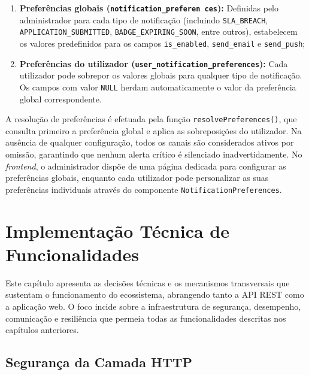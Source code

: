 \documentclass[12pt,a4paper]{report}
\begin{document}
\begin{enumerate}
  \item \textbf{Preferências globais (\texttt{notification\_preferen ces}):} Definidas pelo administrador para cada tipo de notificação (incluindo \texttt{SLA\_\allowbreak BREACH}, \texttt{APPLICATION\_\allowbreak SUBMITTED}, \texttt{BADGE\_\allowbreak EXPIRING\_\allowbreak SOON}, entre outros), estabelecem os valores predefinidos para os campos \texttt{is\_enabled}, \texttt{send\_email} e \texttt{send\_push};
  \item \textbf{Preferências do utilizador (\texttt{user\_\allowbreak notification\_\allowbreak preferences}):} Cada utilizador pode sobrepor os valores globais para qualquer tipo de notificação. Os campos com valor \texttt{NULL} herdam automaticamente o valor da preferência global correspondente.
\end{enumerate}

A resolução de preferências é efetuada pela função \texttt{resolvePreferences()}, que consulta primeiro a preferência global e aplica as sobreposições do utilizador. Na ausência de qualquer configuração, todos os canais são considerados ativos por omissão, garantindo que nenhum alerta crítico é silenciado inadvertidamente. No \textit{frontend}, o administrador dispõe de uma página dedicada para configurar as preferências globais, enquanto cada utilizador pode personalizar as suas preferências individuais através do componente \texttt{NotificationPreferences}.

\chapter{Implementação Técnica de Funcionalidades}
\label{ch:implementacao-tecnica}

Este capítulo apresenta as decisões técnicas e os mecanismos transversais que sustentam o funcionamento do ecossistema, abrangendo tanto a API REST como a aplicação web. O foco incide sobre a infraestrutura de segurança, desempenho, comunicação e resiliência que permeia todas as funcionalidades descritas nos capítulos anteriores.

\section{Segurança da Camada HTTP}
\end{document}
